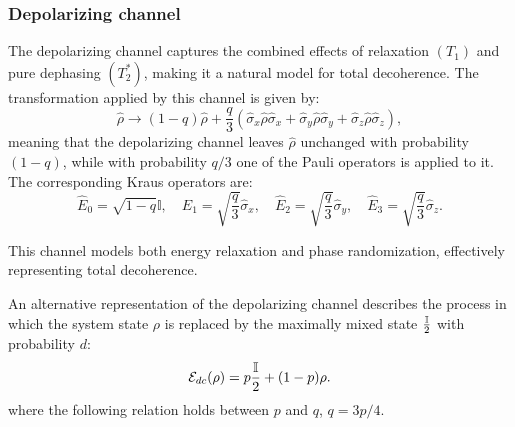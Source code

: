\subsubsection{Depolarizing channel}
The depolarizing channel captures the combined effects of relaxation $(T_1)$ and pure dephasing $(T_2^*)$, making it a natural model for total decoherence. The transformation applied by this channel is given by:
\begin{equation}
    \hat{\rho} \rightarrow (1 - q) \hat{\rho} + \frac{q}{3} (\hat{\sigma}_x \hat{\rho} \hat{\sigma}_x + \hat{\sigma}_y \hat{\rho} \hat{\sigma}_y + \hat{\sigma}_z \hat{\rho} \hat{\sigma}_z),
\end{equation}
meaning that the depolarizing channel leaves  $\hat{\rho}$ unchanged with probability $(1-q)$, while with probability $q/3$ one of the Pauli operators is applied to it.
The corresponding Kraus operators are:
\begin{equation}
    \hat{E}_0 = \sqrt{1 - q} \mathbb{I}, \quad
    \hat{E}_1 = \sqrt{\frac{q}{3}} \hat{\sigma}_x, \quad
    \hat{E}_2 = \sqrt{\frac{q}{3}} \hat{\sigma}_y, \quad
    \hat{E}_3 = \sqrt{\frac{q}{3}} \hat{\sigma}_z.
\end{equation}

This channel models both energy relaxation and phase randomization, effectively representing total decoherence.

An alternative representation of the depolarizing channel describes the process in which the system state $\rho$ is replaced by the maximally mixed state $\frac{\mathbb{I}}{2}$ with probability $d$:
\begin{equation}\label{eq:depolarizing_channel}
    \mathcal{E}_{dc}(\rho) = p\frac{\mathbb{I}}{2}+(1-p)\rho.
\end{equation}
where the following relation holds between  $p$ and $q$, $q=3p/4$.

